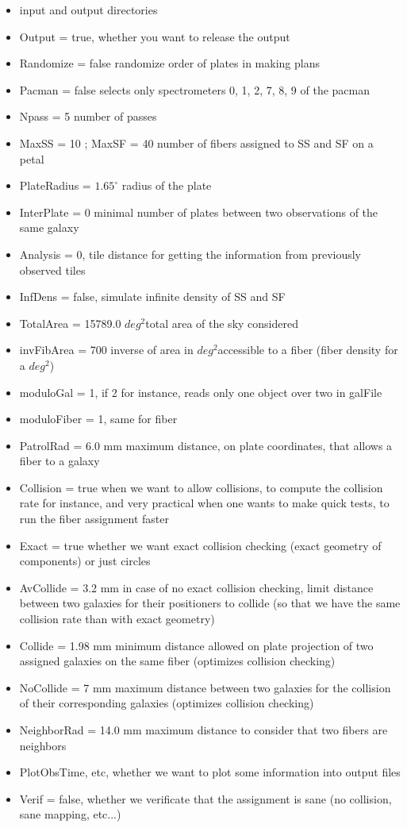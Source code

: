 \documentclass{article}
\def\sqd{$deg^{2}$}
\begin{document}
\begin{itemize}
	\item input and output directories
	\item Output = true, whether you want to release the output

	\item Randomize = false randomize order of plates in making plans
	\item Pacman = false selects only spectrometers 0, 1, 2, 7, 8, 9 of the pacman
	\item Npass = 5 number of passes
	\item MaxSS = 10 ; MaxSF = 40 number of fibers assigned to SS and SF on a petal
	\item PlateRadius = $1.65^{\circ}$ radius of the plate
	\item InterPlate = 0 minimal number of plates between two observations of the same galaxy
	\item Analysis = 0, tile distance for getting the information from previously observed tiles
	\item InfDens = false, simulate infinite density of SS and SF

	\item TotalArea = 15789.0 \sqd total area of the sky considered
	\item invFibArea = 700 inverse of area in \sqd accessible to a fiber (fiber density for a \sqd)
	\item moduloGal = 1, if 2 for instance, reads only one object over two in galFile
	\item moduloFiber = 1, same for fiber

	\item PatrolRad = 6.0 mm maximum distance, on plate coordinates, that allows a fiber to a galaxy


	\item Collision = true when we want to allow collisions, to compute the collision rate for instance, and very practical when one wants to make quick tests, to run the fiber assignment faster
	\item Exact = true whether we want exact collision checking (exact geometry of components) or just circles
	\item AvCollide = 3.2 mm in case of no exact collision checking, limit distance between two galaxies for their positioners to collide (so that we have the same collision rate than with exact geometry)
	\item Collide = 1.98 mm minimum distance allowed on plate projection of two assigned galaxies on the same fiber (optimizes collision checking)
	\item NoCollide = 7 mm maximum distance between two galaxies for the collision of their corresponding galaxies (optimizes collision checking)
	\item NeighborRad = 14.0 mm maximum distance to consider that two fibers are neighbors

	\item PlotObsTime, etc, whether we want to plot some information into output files
	\item Verif = false, whether we verificate that the assignment is sane (no collision, sane mapping, etc...)
\end{itemize}
\end{document}
